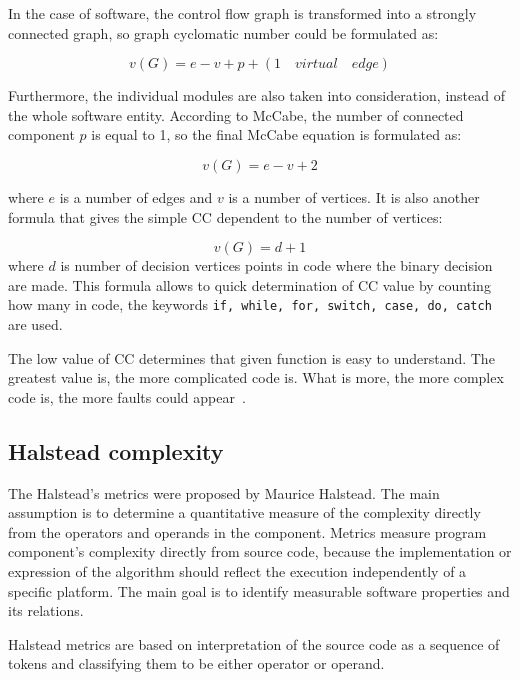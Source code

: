 In the case of software, the control flow graph is transformed into a strongly connected graph, so graph cyclomatic number could be formulated as:

\begin{equation}
v(G) = e - v + p + (1\quad virtual \quad edge)
\end{equation} 

Furthermore, the individual modules are also taken into consideration, instead of the whole software entity. According to McCabe, the number of connected component $p$ is equal to 1, so the final McCabe equation is formulated as:

\begin{equation}
v(G) = e - v + 2
\end{equation}

where $e$ is a number of edges and $v$ is a number of vertices. It is also another formula that gives the simple \ac{CC} dependent to the number of vertices:

\begin{equation}
v(G) = d + 1
\end{equation}
where $d$ is number of decision vertices points in code where the binary decision are made. This formula allows to quick determination of \ac{CC} value by counting how many in code, the keywords \texttt{if, while, for, switch, case, do, catch} are used. 

The low value of \ac{CC} determines that given function is easy to understand. The greatest value is, the more complicated code is. What is more, the more complex code is, the more faults could appear~\cite{alain}.

\subsection{Halstead complexity}
\label{sec:halstead}

The Halstead's metrics were proposed by Maurice Halstead. The main assumption is to determine a quantitative measure of the complexity directly from the operators and operands in the component. Metrics measure program component's complexity directly from source code, because the implementation or expression of the algorithm should reflect the execution independently of a specific platform. The main goal is to identify measurable software properties and its relations.

Halstead metrics are based on interpretation of the source code as a sequence of tokens and classifying them to be either operator or operand.   

